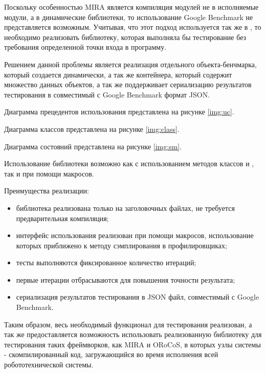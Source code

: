 Поскольку особенностью MIRA является компиляция модулей не в исполняемые модули, а в динамические библиотеки, то использование Google Benchmark не представляется возможным. Учитывая, что этот подход используется так же в \toolchain{}, то необходимо реализовать библиотеку, которая выполняла бы тестирование без требования определенной точки входа в программу.

Решением данной проблемы является реализация отдельного объекта-бенчмарка, который создается динамически, а так же контейнера, который содержит множество данных объектов, а так же поддерживает сериализацию результатов тестирования в совместимый с Google Benchmark формат JSON.


Диаграмма прецедентов использования представлена на рисунке \ref{img:uc}. 

Диаграмма классов представлена на рисунке \ref{img:class}. 

Диаграмма состояний представлена на рисунке \ref{img:sm}. 

Использование библиотеки возможно как с использованием методов классов  и , так и при помощи макросов.

Преимущества реализации:
\begin{itemize}[noitemsep]
	\item библиотека реализована только на заголовочных файлах, не требуется предварительная компиляция;
	\item интерфейс использования реализован при помощи макросов, использование которых приближено к методу сэмплирования в профилировщиках;
	\item тесты выполняются фиксированное количество итераций;
	\item первые итерации отбрасываются для повышения точности результата;
	\item сериализация результатов тестирования в JSON файл, совместимый с Google Benchmark.
\end{itemize}

Таким образом, весь необходимый функционал для тестирования реализован, а так же предоставляется возможность использовать реализованную библиотеку для тестирования таких фреймворков, как MIRA и ORoCoS, в которых узлы системы - скомпилированный код, загружающийся во время исполнения всей робототехнической системы.


